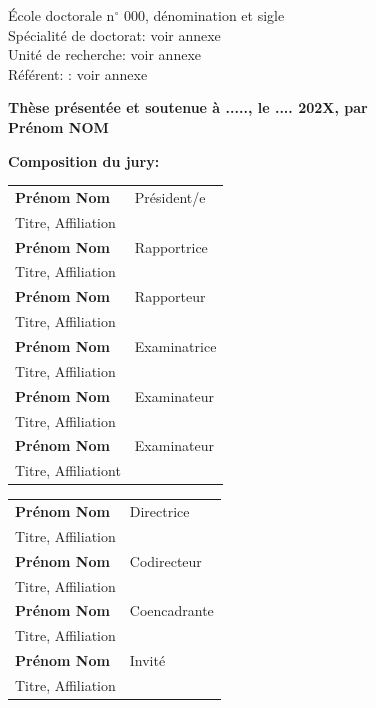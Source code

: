 \documentclass[12pt,a4paper]{book}
\begin{document}
\begin{titlepage}
École doctorale n$^{\circ}$ 000, dénomination et sigle\\
\small Spécialité de doctorat: voir annexe\\
\footnotesize Unité de recherche: voir annexe\\
\footnotesize Référent: : voir annexe
\vspace{15mm}

\textbf{Thèse présentée et soutenue à ....., le .... 202X, par}\\
\bigskip
\Large {\color{Prune} \textbf{Prénom NOM}}


\vspace{\fill} %

\flushleft \small \textbf{Composition du jury:}
\bigskip



\scriptsize
\begin{tabular}{|p{8cm}l}
\arrayrulecolor{Prune}
\textbf{Prénom Nom} &   Président/e\\ 
Titre, Affiliation & \\
\textbf{Prénom Nom} &  Rapportrice \\ 
Titre, Affiliation   &   \\ 
\textbf{Prénom Nom} &  Rapporteur \\ 
Titre, Affiliation  &   \\ 
\textbf{Prénom Nom} &  Examinatrice \\ 
Titre, Affiliation   &   \\ 
\textbf{Prénom Nom} &  Examinateur \\ 
Titre, Affiliation   &   \\ 
\textbf{Prénom Nom} &  Examinateur \\ 
Titre, Affiliationt   &   \\ 

\end{tabular} 

\medskip
\begin{tabular}{|p{8cm}l}\arrayrulecolor{white}
\textbf{Prénom Nom} &   Directrice\\ 
Titre, Affiliation & \\
\textbf{Prénom Nom} &   Codirecteur\\ 
Titre, Affiliation  &   \\ 
\textbf{Prénom Nom} &   Coencadrante\\ 
Titre, Affiliation  &   \\ 
\textbf{Prénom Nom} &  Invité \\ 
Titre, Affiliation  &   \\ 


\end{tabular} 


\end{titlepage}
\ifthispageodd{\newpage\thispagestyle{empty}\null\newpage}{}
\thispagestyle{empty}
\selectfont
\end{document}
